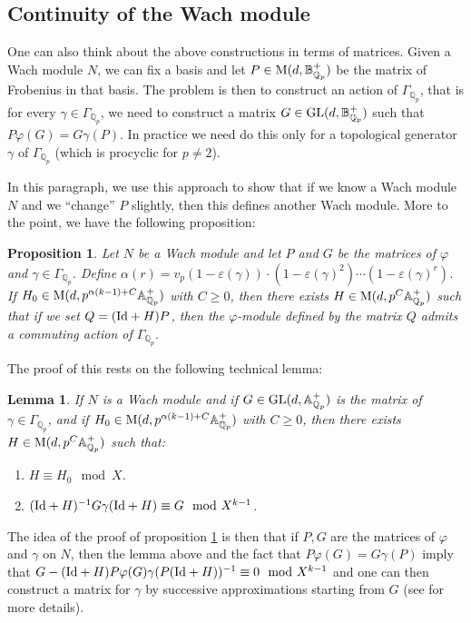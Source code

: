 \documentclass[11pt]{amsart}
\def\Q{{\mathbb Q}_p}
\def\eps{\varepsilon}
\def\aplus{\mathbb{A}^+}
\def\bplus{\mathbb{B}^+}
\newtheorem{prop}[definit]{\bf{Proposition}}
\newtheorem{lem}[definit]{\bf{Lemma}}
\begin{document}
\subsection{Continuity of the Wach module} 
One can also think about the above constructions 
in terms of matrices. Given a  
Wach module $N$, we can fix a basis and let $P \in   
{\rm M}(d,\bplus_{\Q})$ be the matrix of Frobenius 
in that basis. The problem is then to construct an  
action of $\Gamma_{\Q}$, that  
is for every $\gamma \in \Gamma_{\Q}$,  
we need to construct a matrix $G \in  
{\rm GL}(d,\bplus_{\Q})$ such that $P \varphi(G) = G \gamma(P)$. 
In practice we need do this only for a topological  
generator $\gamma$ of $\Gamma_{\Q}$ (which is procyclic for $p \neq 
2$).   
 
In this paragraph, we use this approach to show  
that if we know a Wach module $N$ and we ``change'' $P$ slightly, 
then this defines another Wach module. More to the point, we  
have the following proposition: 
 
\begin{prop}\label{wachperturb} 
Let $N$ be a Wach module and let $P$ and $G$ be the matrices of $\varphi$ 
and $\gamma \in \Gamma_{\Q}$. Define $\alpha(r)=v_p (1-\eps(\gamma)) \cdot  
(1-\eps(\gamma)^2) \cdots (1-\eps(\gamma)^r)$. If $H_0 \in {\rm M} 
(d, p^{\alpha(k-1)+C} \aplus_{\Q})$ with $C \geq 0$, then there exists  
$H \in {\rm M} (d, p^C \aplus_{\Q})$ such that if we set $Q=({\rm 
Id}+H)P$, then the $\varphi$-module defined by the matrix $Q$ admits a 
commuting action of $\Gamma_{\Q}$. 
\end{prop} 
 
The proof of this rests on the following technical lemma: 
 
\begin{lem}\label{wachclose} 
If $N$ is a Wach module and if $G \in {\rm GL}(d,\aplus_{\Q})$  
is the matrix of $\gamma \in \Gamma_{\Q}$, and if $H_0 \in {\rm M} 
(d, p^{\alpha(k-1)+C} \aplus_{\Q})$ with $C \geq 0$,  
then there exists $H \in {\rm M} 
(d, p^C \aplus_{\Q})$ such that: 
\begin{enumerate} 
\item $H \equiv H_0 \mod{X}$. 
\item $({\rm Id}+H)^{-1} G \gamma({\rm Id}+H) \equiv G \mod{X^{k-1}}$.  
\end{enumerate} 
\end{lem} 
 
The idea of the proof of proposition \ref{wachperturb} 
is then that if $P,G$ are the matrices of $\varphi$ 
and $\gamma$ on $N$, then the lemma above and 
the fact that $P \varphi(G) = G \gamma(P)$ imply that  
$G - ({\rm Id}+H) P \varphi(G) \gamma(P({\rm Id}+H))^{-1} \equiv 0 
\mod{X^{k-1}}$ and one can then construct a matrix for $\gamma$ by 
successive approximations starting from $G$ (see \cite[\S 3.1]{BLZ} 
for more details). 
 
\end{document}
